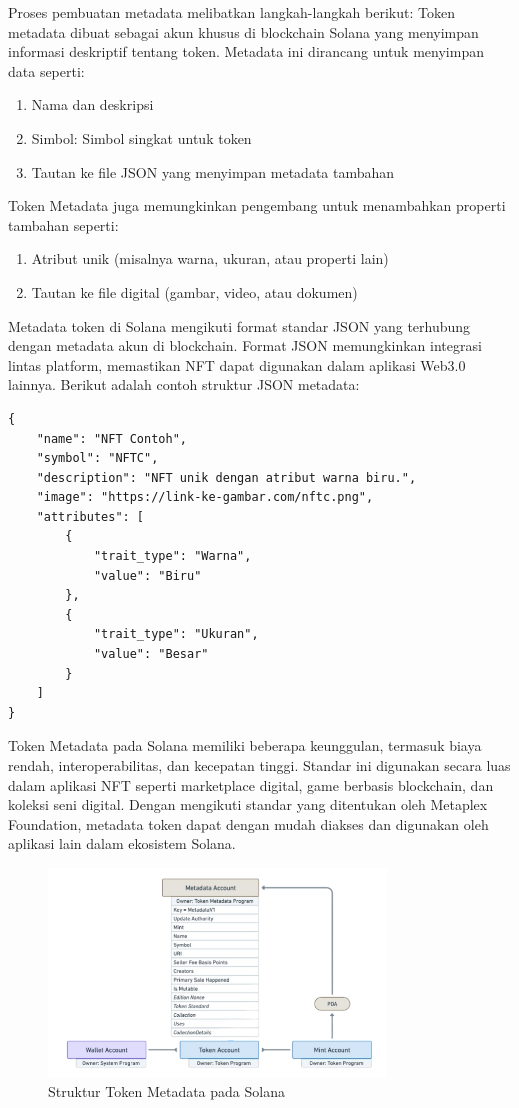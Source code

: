 Proses pembuatan metadata melibatkan langkah-langkah berikut: 
Token metadata dibuat sebagai akun khusus di blockchain Solana yang menyimpan informasi deskriptif tentang token. Metadata ini dirancang untuk menyimpan data seperti:
\begin{enumerate}
    \item Nama dan deskripsi
    \item Simbol: Simbol singkat untuk token
    \item Tautan ke file JSON yang menyimpan metadata tambahan
\end{enumerate}


Token Metadata juga memungkinkan pengembang untuk menambahkan properti tambahan seperti:
\begin{enumerate}
    \item Atribut unik (misalnya warna, ukuran, atau properti lain)
    \item Tautan ke file digital (gambar, video, atau dokumen)
\end{enumerate}

Metadata token di Solana mengikuti format standar JSON yang terhubung dengan metadata akun di blockchain. Format JSON memungkinkan integrasi lintas platform, memastikan NFT dapat digunakan dalam aplikasi Web3.0 lainnya. Berikut adalah contoh struktur JSON metadata:
\begin{verbatim}
{
    "name": "NFT Contoh",
    "symbol": "NFTC",
    "description": "NFT unik dengan atribut warna biru.",
    "image": "https://link-ke-gambar.com/nftc.png",
    "attributes": [
        {
            "trait_type": "Warna",
            "value": "Biru"
        },
        {
            "trait_type": "Ukuran",
            "value": "Besar"
        }
    ]
}
\end{verbatim}

Token Metadata pada Solana memiliki beberapa keunggulan, termasuk biaya rendah, interoperabilitas, dan kecepatan tinggi. Standar ini digunakan secara luas dalam aplikasi NFT seperti marketplace digital, game berbasis blockchain, dan koleksi seni digital. Dengan mengikuti standar yang ditentukan oleh Metaplex Foundation, metadata token dapat dengan mudah diakses dan digunakan oleh aplikasi lain dalam ekosistem Solana.

\begin{figure}[H]
    \centering
    \includegraphics[width=0.8\textwidth]{gambar/2.2.4.png}
    \caption{Struktur Token Metadata pada Solana \parencite{ref10}}
    \label{fig:token-metadata}
\end{figure}

